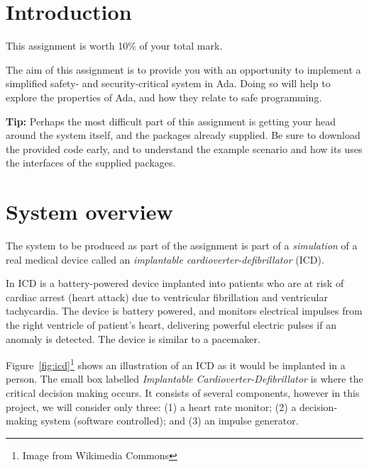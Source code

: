 \documentclass[11pt]{article}
\begin{document}

\section{Introduction}

This assignment is worth 10\% of your total mark.

The aim of this assignment is to provide you with an opportunity to implement a simplified safety- and security-critical system in Ada. Doing so will help to explore the properties of Ada, and how they relate to safe programming.

\textbf{Tip:} Perhaps the most difficult part of this assignment is getting your head around the system itself, and the packages already supplied. Be sure to download the provided code early, and to understand the example scenario and how its uses the interfaces of the supplied packages.


\section{System overview}

The system to be produced as part of the assignment is part of a \emph{simulation} of a real medical device called an \emph{implantable cardioverter-defibrillator} (ICD).

In ICD is a battery-powered device implanted into patients who are at risk of cardiac arrest (heart attack) due to ventricular fibrillation and ventricular tachycardia. The device is battery powered, and monitors electrical impulses from the right ventricle of patient's heart, delivering powerful electric pulses if an anomaly is detected. The device is similar to a pacemaker.

Figure~\ref{fig:icd}\footnote{Image from Wikimedia Commons} shows an illustration of an ICD as it would be implanted in a person. The small box labelled \emph{Implantable Cardioverter-Defibrillator} is where the critical decision making occurs. It consists of several components, however in this project, we will consider only three: (1) a heart rate monitor; (2) a decision-making system (software controlled); and (3) an impulse generator.
\end{document}
